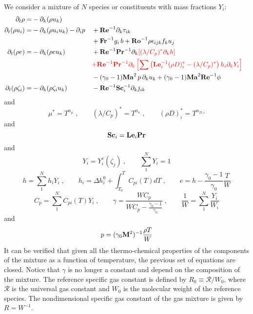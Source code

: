 We consider a mixture of $N$ species or constituents with mass fractions $Y_i$:
\begin{subequations}
  \begin{align}
    \partial_t \rho       =& -\partial_k (\rho u_k)                                                \\
    \partial_t (\rho u_i) =& -\partial_k (\rho u_i u_k )-\partial_i p
    && +\mathrm{\bf Re}^{-1}\partial_k \tau_{ik}                                                    \nonumber\\
    & && +\mathrm{\bf Fr}^{-1} g_i\,b +\mathrm{\bf Ro}^{-1}\rho\epsilon_{ijk} f_ku_j                                     \\
    \partial_t (\rho e)   =& -\partial_k (\rho e u_k )
    && +\mathrm{\bf Re}^{-1}\mathrm{\bf Pr}^{-1}\partial_k\color{red}{\left[(\lambda/C_p)^{*}\partial_kh\right]}\nonumber\\
    & && \color{red}{+\mathrm{\bf Re}^{-1}\mathrm{\bf Pr}^{-1} \partial_k\left[\sum\left(\mathrm{\bf Le}_i^{-1}(\rho D)_i^*
    -(\lambda/C_p)^*\right)h_i \partial_k  Y_i\right]}                                  \nonumber\\
    & && -(\gamma_0-1)\mathrm{\bf Ma}^2\,p\, \partial_k u_k  + (\gamma_0-1)\mathrm{\bf Ma}^2\mathrm{\bf Re}^{-1}\phi                 \\
    \partial_t (\rho \zeta_i)=& -\partial_k (\rho \zeta_i u_k)
    && -\mathrm{\bf Re}^{-1}\mathrm{\bf Sc}_i^{-1} \partial_k j_{ik}
  \end{align}
\end{subequations}
and
\begin{equation}
  \mu^{*} = T^{n_\mu}\;,\qquad (\lambda/C_p)^{*} = T^{n_\kappa} \;,\qquad (\rho
  D)_i^{*} = T^{n_{D,i}}
\end{equation}
and
\begin{equation}
  \mathrm{\bf Sc}_i = \mathrm{\bf Le}_i \mathrm{\bf Pr}
\end{equation}
and
\begin{equation}
  Y_i = Y^e_i(\zeta_j)\;, \qquad \sum^N_1 Y_i=1
\end{equation}
\begin{equation}
  h = \sum^N_1 h_{i} Y_i \;,\qquad h_{i} = \Delta h^0_i + \int^{T}_{T_0}
  C_{pi}(T) dT\;,\qquad e = h - \frac{\gamma_0-1}{\gamma_0}\frac{T}{W}
\end{equation}
\begin{equation}
  C_p = \sum^N_1 C_{pi}(T) Y_i\;,\qquad
  \gamma = \frac{W C_p}{W C_p-\frac{\gamma_0-1}{\gamma_0}} \;,\qquad
  \frac{1}{W} = \sum^N_1 \frac{Y_i}{W_i}
\end{equation}
and
\begin{equation}
  p = (\gamma_0 \mathrm{\bf M}^2)^{-1} \frac{\rho T}{W}
\end{equation}
It can be verified that given all the thermo-chemical properties of the components of the mixture as a function of temperature, the previous set of equations are closed. Notice that $\gamma$ is no longer a constant and depend on the composition of the mixture. The reference specific gas constant is defined by $R_0\equiv \mathcal{R}/W_0$, where $\mathcal{R}$ is the universal gas constant and $W_0$ is the molecular weight of the reference species. The nondimensional specific gas constant of the gas mixture is given by $R=W^{-1}$.

